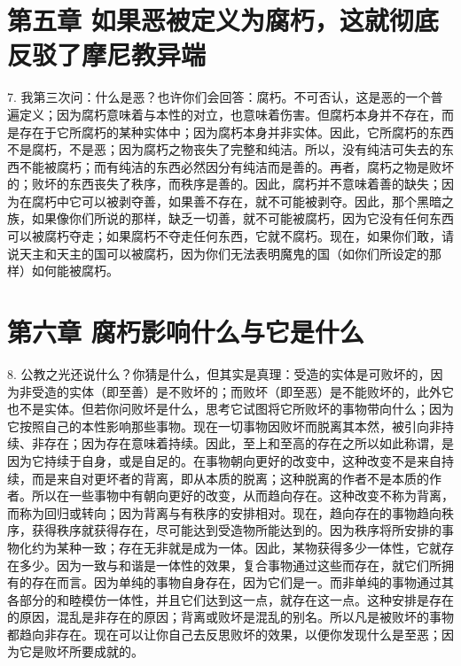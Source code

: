 \section{第五章 如果恶被定义为腐朽，这就彻底反驳了摩尼教异端}

7. 我第三次问：什么是恶？也许你们会回答：腐朽。不可否认，这是恶的一个普遍定义；因为腐朽意味着与本性的对立，也意味着伤害。但腐朽本身并不存在，而是存在于它所腐朽的某种实体中；因为腐朽本身并非实体。因此，它所腐朽的东西不是腐朽，不是恶；因为腐朽之物丧失了完整和纯洁。所以，没有纯洁可失去的东西不能被腐朽；而有纯洁的东西必然因分有纯洁而是善的。再者，腐朽之物是败坏的；败坏的东西丧失了秩序，而秩序是善的。因此，腐朽并不意味着善的缺失；因为在腐朽中它可以被剥夺善，如果善不存在，就不可能被剥夺。因此，那个黑暗之族，如果像你们所说的那样，缺乏一切善，就不可能被腐朽，因为它没有任何东西可以被腐朽夺走；如果腐朽不夺走任何东西，它就不腐朽。现在，如果你们敢，请说天主和天主的国可以被腐朽，因为你们无法表明魔鬼的国（如你们所设定的那样）如何能被腐朽。\par


\section{第六章 腐朽影响什么与它是什么}

8. 公教之光还说什么？你猜是什么，但其实是真理：受造的实体是可败坏的，因为非受造的实体（即至善）是不败坏的；而败坏（即至恶）是不能败坏的，此外它也不是实体。但若你问败坏是什么，思考它试图将它所败坏的事物带向什么；因为它按照自己的本性影响那些事物。现在一切事物因败坏而脱离其本然，被引向非持续、非存在；因为存在意味着持续。因此，至上和至高的存在之所以如此称谓，是因为它持续于自身，或是自足的。在事物朝向更好的改变中，这种改变不是来自持续，而是来自对更坏者的背离，即从本质的脱离；这种脱离的作者不是本质的作者。所以在一些事物中有朝向更好的改变，从而趋向存在。这种改变不称为背离，而称为回归或转向；因为背离与有秩序的安排相对。现在，趋向存在的事物趋向秩序，获得秩序就获得存在，尽可能达到受造物所能达到的。因为秩序将所安排的事物化约为某种一致；存在无非就是成为一体。因此，某物获得多少一体性，它就存在多少。因为一致与和谐是一体性的效果，复合事物通过这些而存在，就它们所拥有的存在而言。因为单纯的事物自身存在，因为它们是一。而非单纯的事物通过其各部分的和睦模仿一体性，并且它们达到这一点，就存在这一点。这种安排是存在的原因，混乱是非存在的原因；背离或败坏是混乱的别名。所以凡是被败坏的事物都趋向非存在。现在可以让你自己去反思败坏的效果，以便你发现什么是至恶；因为它是败坏所要成就的。\par


